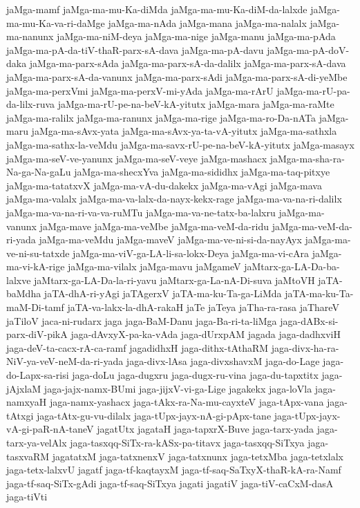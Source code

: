 {jaMga-mamf
jaMga-ma-mu-Ka-diMda
jaMga-ma-mu-Ka-diM-da-lalxde
jaMga-ma-mu-Ka-va-ri-daMge
jaMga-ma-nAda
jaMga-mana
jaMga-ma-nalalx
jaMga-ma-nanunx
jaMga-ma-niM-deya
jaMga-ma-nige
jaMga-manu
jaMga-ma-pAda
jaMga-ma-pA-da-tiV-thaR-parx-sA-dava
jaMga-ma-pA-davu
jaMga-ma-pA-doV-daka
jaMga-ma-parx-sAda
jaMga-ma-parx-sA-da-dalilx
jaMga-ma-parx-sA-dava
jaMga-ma-parx-sA-da-vanunx
jaMga-ma-parx-sAdi
jaMga-ma-parx-sA-di-yeMbe
jaMga-ma-perxVmi
jaMga-ma-perxV-mi-yAda
jaMga-ma-rArU
jaMga-ma-rU-pa-da-lilx-ruva
jaMga-ma-rU-pe-na-beV-kA-yitutx
jaMga-mara
jaMga-ma-raMte
jaMga-ma-ralilx
jaMga-ma-ranunx
jaMga-ma-rige
jaMga-ma-ro-Da-nATa
jaMga-maru
jaMga-ma-sAvx-yata
jaMga-ma-sAvx-ya-ta-vA-yitutx
jaMga-ma-sathxla
jaMga-ma-sathx-la-veMdu
jaMga-ma-savx-rU-pe-na-beV-kA-yitutx
jaMga-masayx
jaMga-ma-seV-ve-yanunx
jaMga-ma-seV-veye
jaMga-mashacx
jaMga-ma-sha-ra-Na-ga-Na-gaLu
jaMga-ma-shecxYva
jaMga-ma-sididhx
jaMga-ma-taq-pitxye
jaMga-ma-tatatxvX
jaMga-ma-vA-du-dakekx
jaMga-ma-vAgi
jaMga-mava
jaMga-ma-valalx
jaMga-ma-va-lalx-da-nayx-kekx-rage
jaMga-ma-va-na-ri-dalilx
jaMga-ma-va-na-ri-va-va-ruMTu
jaMga-ma-va-ne-tatx-ba-lalxru
jaMga-ma-vanunx
jaMga-mave
jaMga-ma-veMbe
jaMga-ma-veM-da-ridu
jaMga-ma-veM-da-ri-yada
jaMga-ma-veMdu
jaMga-maveV
jaMga-ma-ve-ni-si-da-nayAyx
jaMga-ma-ve-ni-su-tatxde
jaMga-ma-viV-ga-LA-li-sa-lokx-Deya
jaMga-ma-vi-cAra
jaMga-ma-vi-kA-rige
jaMga-ma-vilalx
jaMga-mavu
jaMgameV
jaMtarx-ga-LA-Da-ba-lalxve
jaMtarx-ga-LA-Da-la-ri-yavu
jaMtarx-ga-La-nA-Di-suva
jaMtoVH
jaTA-baMdha
jaTA-dhA-ri-yAgi
jaTAgerxV
jaTA-ma-ku-Ta-ga-LiMda
jaTA-ma-ku-Ta-maM-Di-tamf
jaTA-va-lakx-la-dhA-rakaH
jaTe
jaTeya
jaTha-ra-rasa
jaThareV
jaTiloV
jaca-ni-rudarx
jaga
jaga-BaM-Danu
jaga-Ba-ri-ta-liMga
jaga-dABx-si-parx-diV-pikA
jaga-dAvxyX-pa-ka-vAda
jaga-dUrxpAM
jagada
jaga-dadhxviH
jaga-deV-ta-cacx-rA-ca-ramf
jagadidhxH
jaga-dithx-tAthaRM
jaga-divx-ha-ra-NiV-ya-veV-neM-da-ri-yada
jaga-divx-lAsa
jaga-divxshavxM
jaga-do-Lage
jaga-do-Lapx-sa-risi
jaga-doLu
jaga-dugxru
jaga-dugx-ru-vina
jaga-du-tapxtitx
jaga-jAjxlaM
jaga-jajx-namx-BUmi
jaga-jijxV-vi-ga-Lige
jagakekx
jaga-loVla
jaga-namxyaH
jaga-namx-yashacx
jaga-tAkx-ra-Na-mu-cayxteV
jaga-tApx-vana
jaga-tAtxgi
jaga-tAtx-gu-vu-dilalx
jaga-tUpx-jayx-nA-gi-pApx-tane
jaga-tUpx-jayx-vA-gi-paR-nA-taneV
jagatUtx
jagataH
jaga-tapxrX-Buve
jaga-tarx-yada
jaga-tarx-ya-velAlx
jaga-tasxqq-SiTx-ra-kASx-pa-titavx
jaga-tasxqq-SiTxya
jaga-tasxvaRM
jagatatxM
jaga-tatxnenxV
jaga-tatxnunx
jaga-tetxMba
jaga-tetxlalx
jaga-tetx-lalxvU
jagatf
jaga-tf-kaqtayxM
jaga-tf-saq-SaTxyX-thaR-kA-ra-Namf
jaga-tf-saq-SiTx-gAdi
jaga-tf-saq-SiTxya
jagati
jagatiV
jaga-tiV-caCxM-dasA
jaga-tiVti
}
